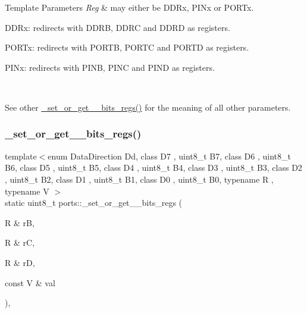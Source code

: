 \begin{DoxyTemplParams}{Template Parameters}
{\em Reg} & may either be {\ttfamily D\+D\+Rx}, {\ttfamily P\+I\+Nx} or {\ttfamily P\+O\+R\+Tx}.
\begin{DoxyItemize}
\item {\ttfamily D\+D\+Rx}\+: redirects with {\ttfamily D\+D\+RB}, {\ttfamily D\+D\+RC} and {\ttfamily D\+D\+RD} as registers.
\item {\ttfamily P\+O\+R\+Tx}\+: redirects with {\ttfamily P\+O\+R\+TB}, {\ttfamily P\+O\+R\+TC} and {\ttfamily P\+O\+R\+TD} as registers.
\item {\ttfamily P\+I\+Nx}\+: redirects with {\ttfamily P\+I\+NB}, {\ttfamily P\+I\+NC} and {\ttfamily P\+I\+ND} as registers.
\end{DoxyItemize}\\
\hline
\end{DoxyTemplParams}
See other \hyperlink{namespaceports_a541ed8a2807f6d65c80cdf90cd7106eb}{\+\_\+set\+\_\+or\+\_\+get\+\_\+\_\+bits\+\_\+regs()} for the meaning of all other parameters. \hypertarget{namespaceports_a541ed8a2807f6d65c80cdf90cd7106eb}{}\label{namespaceports_a541ed8a2807f6d65c80cdf90cd7106eb} 
\subsubsection{\texorpdfstring{\+\_\+set\+\_\+or\+\_\+get\+\_\+\_\+bits\+\_\+regs()}{\_set\_or\_get\_8\_bits\_regs()}}
{\footnotesize\ttfamily template$<$enum Data\+Direction Dd, class D7 , uint8\+\_\+t B7, class D6 , uint8\+\_\+t B6, class D5 , uint8\+\_\+t B5, class D4 , uint8\+\_\+t B4, class D3 , uint8\+\_\+t B3, class D2 , uint8\+\_\+t B2, class D1 , uint8\+\_\+t B1, class D0 , uint8\+\_\+t B0, typename R , typename V $>$ \\
static uint8\+\_\+t ports\+::\+\_\+set\+\_\+or\+\_\+get\+\_\+\_\+bits\+\_\+regs (\begin{DoxyParamCaption}\item[{R \&}]{rB,  }\item[{R \&}]{rC,  }\item[{R \&}]{rD,  }\item[{const V \&}]{val }\end{DoxyParamCaption})\hspace{0.3cm}{\ttfamily [inline]}, {\ttfamily [static]}}



